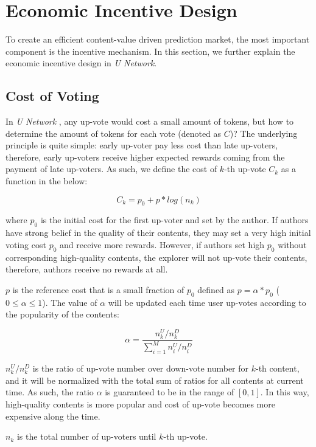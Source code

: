 \section{Economic Incentive Design}
To create an efficient content-value driven prediction market, the most important component is the incentive mechanism. In this section, we further explain the economic incentive design in \emph{U Network}.

\subsection{Cost of Voting}
In \emph{U Network} , any up-vote would cost a small amount of tokens, but how to determine the amount of tokens for each vote (denoted as $C$)? The underlying principle is quite simple: early up-voter pay less cost than late up-voters, therefore, early up-voters receive higher expected rewards coming from the payment of late up-voters. As such, we define the cost of $k$-th up-vote $C_{k}$ as a function in the below:
 \begin{center}
$$C_{k} = p_0 + p * log(n_{k})$$
\end{center}
where $p_0$ is the initial cost for the first up-voter and set by the author. If authors have strong belief in the quality of their contents, they may set a very high initial voting cost $p_0$ and receive more rewards. However, if authors set high $p_0$ without corresponding high-quality contents, the explorer will not up-vote their contents, therefore, authors receive no rewards at all. 

 $p$ is the reference cost that is a small fraction of $p_0$ defined as $p = \alpha * p_0$ ($0 \leq \alpha \leq 1$).  The value of $\alpha$ will be  updated each time user up-votes according to the popularity of the contents: 
  \begin{center}
 $$ \alpha = \frac{ n_{k}^{U} /n_{k}^{D} }{\sum_{i=1}^{M} n_{i}^{U} / n_{i}^{D} } $$
 \end{center}
 
 $n_{k}^{U} /n_{k}^{D}$ is the ratio of up-vote number over down-vote number for $k$-th content, and it will be normalized with the total sum of ratios for all contents at current time. As such, the ratio $\alpha$ is guaranteed to be in the range of $[0, 1]$. In this way, high-quality contents is more popular and cost of up-vote becomes more expensive along the time.
 
 $n_{k}$ is the total number of up-voters until $k$-th up-vote. 

